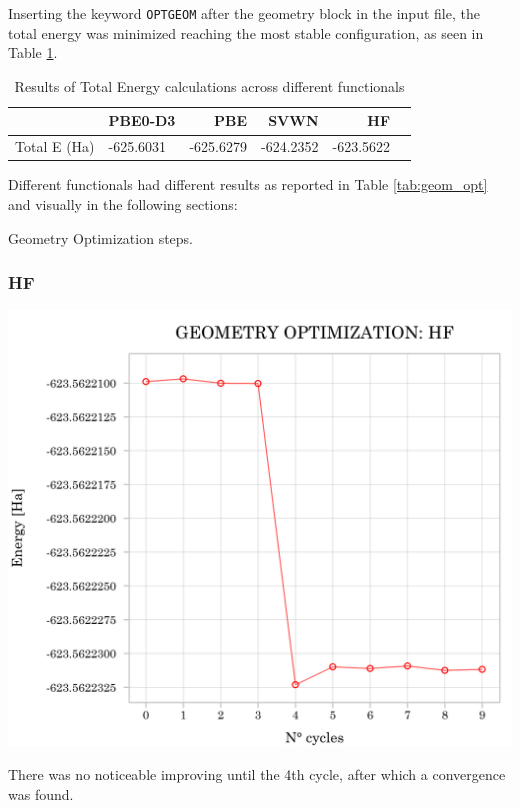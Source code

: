 \documentclass{article}
\begin{document}
Inserting the keyword \texttt{OPTGEOM} after the geometry block in the input file, the total energy was minimized reaching the most stable configuration, as seen in Table \ref{tab:total_E}.

\begin{table}[H]
	\centering
	\begin{tabular}{llrrrr}
		\toprule
		& PBE0-D3 & PBE & SVWN & HF \\
		\midrule
		Total E (Ha) & -625.6031 & -625.6279 & -624.2352 & -623.5622 \\
	\end{tabular}	
	\caption{Results of Total Energy calculations across different functionals}
	\label{tab:total_E}
\end{table}

\noindent Different functionals had different results as reported in Table \ref{tab:geom_opt} and visually in the following sections:

\begin{table}[H]
    \centering
    
    \caption{Geometry Optimization steps.}
    \label{tab:geom_opt}
\end{table}

\subsubsection{HF}
\begin{minipage}[t]{0.55\textwidth}
	\vspace{-\topskip}
	\includegraphics[width=1\textwidth]{../images/HF.png}
	\label{fig:opt_HF}
\end{minipage}
\hfill
\begin{minipage}[t]{0.4\textwidth}
	\vspace{-\topskip}
	\vspace{20pt}
	There was no noticeable improving until the 4th cycle, after which a convergence was found.
\end{minipage}
\end{document}
